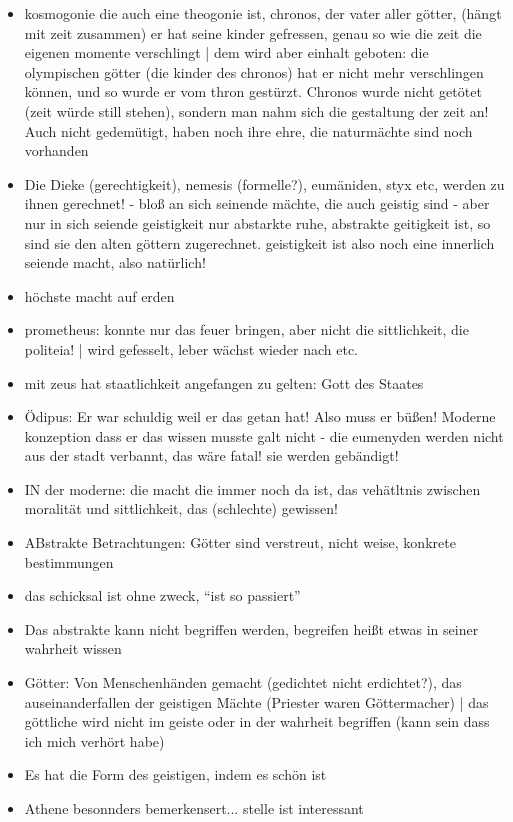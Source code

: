\documentclass[emulatestandardclasses]{scrartcl}
\begin{document}
\begin{itemize}
  \item kosmogonie die auch eine theogonie ist, chronos, der vater aller götter, (hängt mit zeit zusammen) er hat seine kinder gefressen, genau so wie die zeit die eigenen momente verschlingt | dem wird aber einhalt geboten: die olympischen götter (die kinder des chronos) hat er nicht mehr verschlingen können, und so wurde er vom thron gestürzt. Chronos wurde nicht getötet (zeit würde still stehen), sondern man nahm sich die gestaltung der zeit an! Auch nicht gedemütigt, haben noch ihre ehre, die naturmächte sind noch vorhanden
  \item Die Dieke (gerechtigkeit), nemesis (formelle?), eumäniden, styx etc, werden zu ihnen gerechnet! - bloß an sich seinende mächte, die auch geistig sind - aber nur in sich seiende geistigkeit nur abstarkte ruhe, abstrakte geitigkeit ist, so sind sie den alten göttern zugerechnet. geistigkeit ist also noch eine innerlich seiende macht, also natürlich!
  \item höchste macht auf erden
  \item prometheus: konnte nur das feuer bringen, aber nicht die sittlichkeit, die politeia! |  wird gefesselt, leber wächst wieder nach etc. 
  \item mit zeus hat staatlichkeit angefangen zu gelten: Gott des Staates
  \item Ödipus: Er war schuldig weil er das getan hat! Also muss er büßen! Moderne konzeption dass er das wissen musste galt nicht - die eumenyden werden nicht aus der stadt verbannt, das wäre fatal! sie werden gebändigt!
  \item IN der moderne: die macht die immer noch da ist, das vehätltnis zwischen moralität und sittlichkeit, das (schlechte) gewissen!
  \item ABstrakte Betrachtungen: Götter sind verstreut, nicht weise, konkrete bestimmungen
  \item das schicksal ist ohne zweck, "`ist so passiert"'
  \item Das abstrakte kann nicht begriffen werden, begreifen heißt etwas in seiner wahrheit wissen
  \item Götter: Von Menschenhänden gemacht (gedichtet nicht erdichtet?), das auseinanderfallen der geistigen Mächte (Priester waren Göttermacher) | das göttliche wird nicht im geiste oder in der wahrheit begriffen (kann sein dass ich mich verhört habe)
  \item Es hat die Form des geistigen, indem es schön ist
  \item Athene besonnders bemerkensert... stelle ist interessant

\end{itemize}
\end{document}
